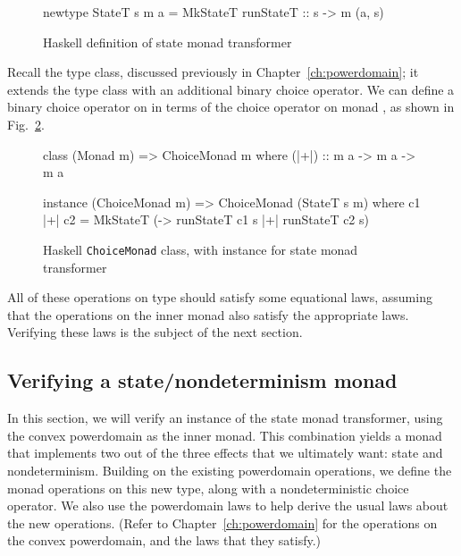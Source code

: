 \begin{figure}
\begin{hscode}
newtype StateT s m a = MkStateT { runStateT :: s -> m (a, s) }
\end{hscode}
\caption{Haskell definition of state monad transformer}
\label{fig:case-state-transformer}
\end{figure}

Recall the  type class, discussed previously in Chapter~\ref{ch:powerdomain}; it extends the  type class with an additional binary choice operator. We can define a binary choice operator on  in terms of the choice operator on monad , as shown in Fig.~\ref{fig:case-choicemonad}.

\begin{figure}
\begin{hscode}
class (Monad m) => ChoiceMonad m where
  (|+|) :: m a -> m a -> m a
\end{hscode}
\begin{hscode}
instance (ChoiceMonad m) => ChoiceMonad (StateT s m) where
  c1 |+| c2 = MkStateT (\s -> runStateT c1 s |+| runStateT c2 s)
\end{hscode}
\caption{Haskell \texttt{ChoiceMonad} class, with instance for state monad transformer}
\label{fig:case-choicemonad}
\end{figure}

All of these operations on type  should satisfy some equational laws, assuming that the operations on the inner monad  also satisfy the appropriate laws. Verifying these laws is the subject of the next section.

\subsection{Verifying a state/nondeterminism monad}
\label{sec:case-verify-N}

In this section, we will verify an instance of the state monad transformer, using the convex powerdomain as the inner monad. This combination yields a monad that implements two out of the three effects that we ultimately want: state and nondeterminism. Building on the existing powerdomain operations, we define the monad operations on this new type, along with a nondeterministic choice operator. We also use the powerdomain laws to help derive the usual laws about the new operations. (Refer to Chapter~\ref{ch:powerdomain} for the operations on the convex powerdomain, and the laws that they satisfy.)

